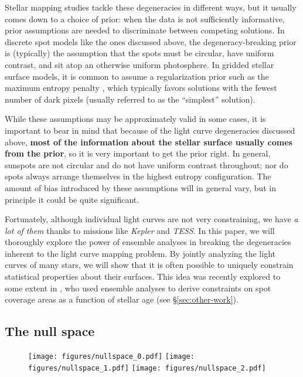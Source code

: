\documentclass[modern]{aastex62}
\begin{document}
Stellar mapping studies tackle these degeneracies in different ways, but
it usually comes down to a choice of prior: when the data is not
sufficiently informative, prior assumptions are needed to discriminate
between competing solutions. In discrete spot models like the ones
discussed above, the degeneracy-breaking prior is (typically) the assumption that the
spots must be circular, have uniform contrast, and sit atop an otherwise
uniform photosphere. In gridded stellar surface models, it is common to
assume a regularization prior such as the maximum entropy penalty
\citep[e.g.,][]{Vogt1987}, which typically favors solutions with the fewest
number of dark pixels (usually referred to as the ``simplest'' solution).

While these assumptions may be approximately valid in some cases, it is
important to bear in mind that because of the light curve degeneracies discussed above,
\textbf{most of the information about the stellar surface usually comes from the prior},
so it is very important to get the
prior right. In general, sunspots are not circular and do not have uniform
contrast throughout; nor do spots always arrange themselves in the highest
entropy configuration. The amount of bias introduced by these assumptions
will in general vary, but in principle it could be quite significant.


Fortunately, although individual light curves are not very constraining,
we have \emph{a lot of them} thanks to missions like \emph{Kepler} and \emph{TESS}.
In this paper, we will thoroughly explore the power of ensemble analyses
in breaking the degeneracies inherent to the light curve mapping problem.
By jointly analyzing the light curves of many stars, we will show that it
is often possible to uniquely constrain statistical properties about their
surfaces. This idea was recently explored to some extent
in \citet{Morris2020}, who used ensemble analyses to derive constraints on
spot coverage areas as a function of stellar age (see \S\ref{sec:other-work}).



\subsection{The null space}
\label{sec:nullspace}

\begin{figure}[p!]
    \begin{centering}
        \texttt{[image: figures/nullspace\_0.pdf]}
        \texttt{[image: figures/nullspace\_1.pdf]}
        \texttt{[image: figures/nullspace\_2.pdf]}
    \end{centering}
\end{figure}
\end{document}
